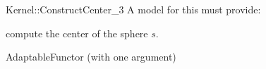 \begin{ccRefFunctionObjectConcept}{Kernel::ConstructCenter_3}
A model for this must provide:


 {compute the center of the sphere $s$.}

\ccRefines
AdaptableFunctor (with one argument)

\ccSeeAlso
{}  \\

\end{ccRefFunctionObjectConcept}
